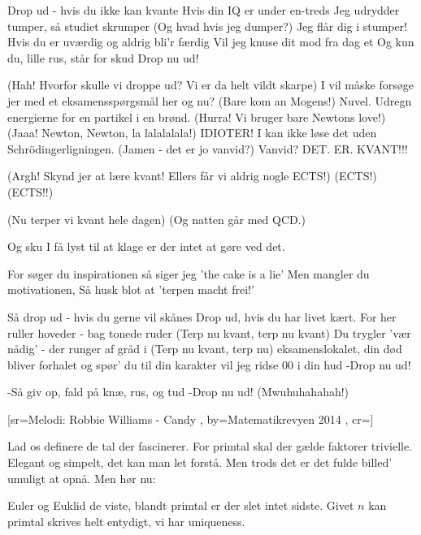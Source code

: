 \documentclass[pdftex,12pt]{article}
\begin{document}
\begin{songs}{}
\endverse
\beginverse
Drop ud - hvis du ikke kan kvante
Hvis din IQ er under en-treds
Jeg udrydder tumper, så studiet skrumper
(Og hvad hvis jeg dumper?)
Jeg flår dig i stumper!
Hvis du er uværdig og aldrig bli'r færdig
Vil jeg knuse dit mod fra dag et
Og kun du, lille rus, står for skud
Drop nu ud!

\endverse
\beginverse
(Hah! Hvorfor skulle vi droppe ud? Vi er da helt vildt skarpe)
I vil måske forsøge jer med et eksamensspørgsmål her og nu?
(Bare kom an Mogens!)
Nuvel. Udregn energierne for en partikel i en brønd.
(Hurra! Vi bruger bare Newtons love!)
(Jaaa! Newton, Newton, la lalalalala!)
IDIOTER! I kan ikke løse det uden Schrödingerligningen.
(Jamen - det er jo vanvid?)
Vanvid?
DET. ER. KVANT!!!

\endverse
\beginverse
(Argh! Skynd jer at lære kvant! Ellers får vi aldrig nogle ECTS!)
(ECTS!)
(ECTS!!)

\endverse
\beginverse
(Nu terper vi kvant hele dagen)
(Og natten går med QCD.)

\endverse
\beginverse
Og sku I få lyst til at klage
er der intet at gøre ved det.

\endverse
\beginverse
For søger du inspirationen
så siger jeg 'the cake is a lie'
Men mangler du motivationen,
Så husk blot at 'terpen macht frei!'

\endverse
\beginverse
Så drop ud - hvis du gerne vil skånes
Drop ud, hvis du har livet kært.
For her ruller hoveder - bag tonede ruder (Terp nu kvant, terp nu kvant)
Du trygler 'vær nådig' - der runger af gråd i (Terp nu kvant, terp nu)
eksamenslokalet, din død bliver forhalet
og spør' du til din karakter
vil jeg ridse 00 i din hud
-Drop nu ud!

\endverse
\beginverse
-Så giv op, fald på knæ, rus, og tud
-Drop nu ud!
(Mwuhuhahahah!)

\endverse
\endsong



﻿[sr={Melodi: Robbie Williams - Candy}
,
by={Matematikrevyen 2014}
,
cr={}]\hypertarget{Primtal}{}
\label{song83}

\beginverse
Lad os definere
de tal der fascinerer.
For primtal skal der gælde
faktorer trivielle.
Elegant og simpelt, det kan man let forstå.
Men trods det er det fulde billed’
umuligt at opnå.
Men hør nu:
\endverse

\beginverse
Euler og Euklid de viste,
blandt primtal er der slet intet sidste.
Givet $n$ kan primtal skrives
helt entydigt, vi har uniqueness.
\endverse


\end{songs}
\end{document}
